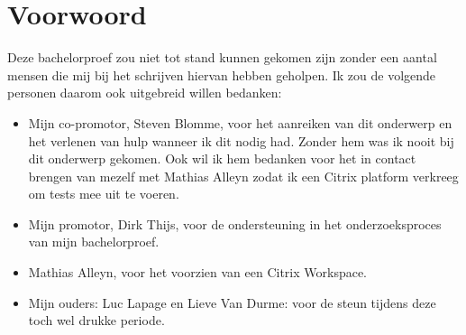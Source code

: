 
\chapter*{Voorwoord}
\label{ch:voorwoord}


Deze bachelorproef zou niet tot stand kunnen gekomen zijn zonder een aantal mensen die mij bij het schrijven hiervan hebben geholpen. Ik zou de volgende personen daarom ook uitgebreid willen bedanken:

\begin{itemize}
	\item Mijn co-promotor, Steven Blomme, voor het aanreiken van dit onderwerp en het verlenen van hulp wanneer ik dit nodig had. Zonder hem was ik nooit bij dit onderwerp gekomen. Ook wil ik hem bedanken voor het in contact brengen van mezelf met Mathias Alleyn zodat ik een Citrix platform verkreeg om tests mee uit te voeren.
	\newline
	\item Mijn promotor, Dirk Thijs, voor de ondersteuning in het onderzoeksproces van mijn bachelorproef.
	\newline
	\item Mathias Alleyn, voor het voorzien van een Citrix Workspace.
	\newline
	\item Mijn ouders: Luc Lapage en Lieve Van Durme: voor de steun tijdens deze toch wel drukke periode.
\end{itemize}
